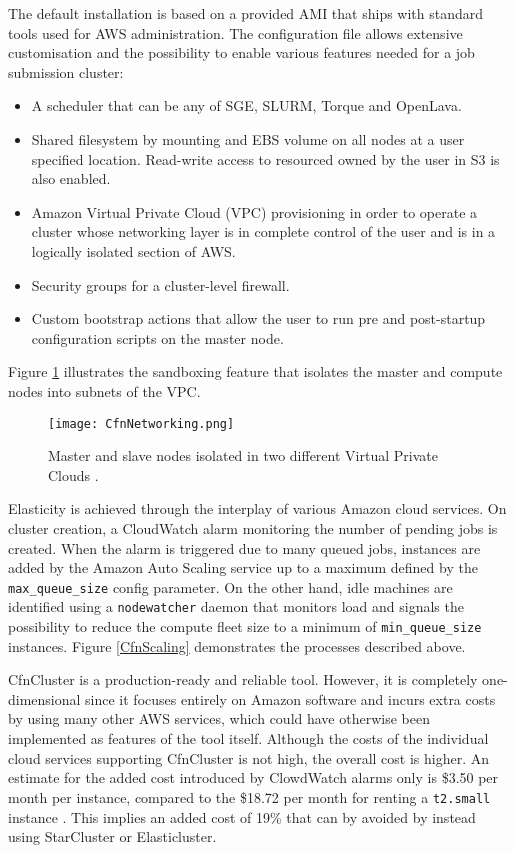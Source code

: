 The default installation is based on a provided AMI that ships with standard tools used for AWS administration. The configuration file allows extensive customisation and the possibility to enable various features needed for a job submission cluster:
\begin{itemize}
	\item A scheduler that can be any of SGE, SLURM, Torque and OpenLava\cite{OpenLava}.
	\item Shared filesystem by mounting and EBS volume on all nodes at a user specified location. Read-write access to resourced owned by the user in S3 is also enabled.
	\item Amazon Virtual Private Cloud (VPC) provisioning in order to operate a cluster whose networking layer is in complete control of the user and is in a logically isolated section of AWS.
	\item Security groups for a cluster-level firewall.
	\item Custom bootstrap actions that allow the user to run pre and post-startup configuration scripts on the master node.
\end{itemize}

Figure \ref{CfnNetworking} illustrates the sandboxing feature that isolates the master and compute nodes into subnets of the VPC.

\begin{figure}[h]
	\centering
		\texttt{[image: CfnNetworking.png]}
	\caption{Master and slave nodes isolated in two different Virtual Private Clouds \cite{CfnVPC}.}
	\label{CfnNetworking}
\end{figure}

Elasticity is achieved through the interplay of various Amazon cloud services. On cluster creation, a CloudWatch alarm monitoring the number of pending jobs is created. When the alarm is triggered due to many queued jobs, instances are added by the Amazon Auto Scaling service up to a maximum defined by the \verb|max_queue_size| config parameter. On the other hand, idle machines are identified using a \verb|nodewatcher| daemon that monitors load and signals the possibility to reduce the compute fleet size to a minimum of \verb|min_queue_size| instances. Figure \ref{CfnScaling} demonstrates the processes described above.

CfnCluster is a production-ready and reliable tool. However, it is completely one-dimensional since it focuses entirely on Amazon software and incurs extra costs by using many other AWS services, which could have otherwise been implemented as features of the tool itself. Although the costs of the individual cloud services supporting CfnCluster is not high, the overall cost is higher. An estimate for the added cost introduced by ClowdWatch alarms only is \$3.50 per month per instance, compared to the \$18.72 per month for renting a \verb|t2.small| instance \cite{AWSPricing}. This implies an added cost of 19\% that can by avoided by instead using StarCluster or Elasticluster.

